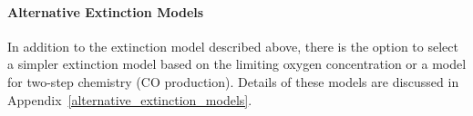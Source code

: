 \paragraph{Alternative Extinction Models}

In addition to the extinction model described above, there is the option to select a simpler extinction model based on the limiting oxygen concentration or a model for two-step chemistry (CO production). Details of these models are discussed in Appendix~\ref{alternative_extinction_models}.



